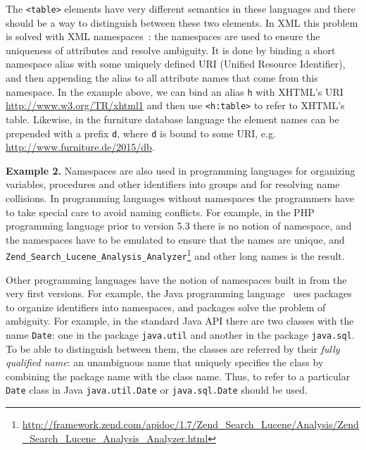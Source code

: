 The \verb|<table>| elements have very different semantics in these languages
and there should be a way to distinguish between these two elements.
In XML this problem is solved with XML namespaces~\cite{xmlnamespaces}:
the namespaces are used to ensure the uniqueness of attributes and resolve ambiguity.
It is done by binding a short namespace alias with some uniquely defined URI
(Unified Resource Identifier), and then appending the alias to
all attribute names that come from this namespace. In the example above,
we can bind an alias \verb|h| with XHTML's URI \url{http://www.w3.org/TR/xhtml1}
and then use \verb|<h:table>| to refer to XHTML's table. Likewise,
in the furniture database language the element names can be prepended
with a prefix \verb|d|, where \verb|d| is bound to some URI, e.g.
\url{http://www.furniture.de/2015/db}.




\textbf{Example 2.} Namespaces are also used in programming languages for organizing
variables, procedures and other identifiers into groups and
for resolving name collisions. In programming languages without
namespaces the programmers have to take special care to avoid
naming conflicts. For example, in the PHP programming language
prior to version 5.3 \cite{mcarthur2008php6} there is no notion of namespace, and
the namespaces have to be emulated to ensure that the names
are unique, and 
\verb|Zend_Search_Lucene_Analysis_Analyzer|\footnote{\url{http://framework.zend.com/apidoc/1.7/Zend_Search_Lucene/Analysis/Zend_Search_Lucene_Analysis_Analyzer.html}}
and other long names is the result.

Other programming languages have the notion of namespaces built in
from the very first versions. For example, the Java programming
language~\cite{gosling2014java} uses packages to organize identifiers into
namespaces, and packages solve the problem of ambiguity. For example,
in the standard Java API there are two classes with the name \texttt{Date}:
one in the package \texttt{java.util} and another in the package \texttt{java.sql}.
To be able to distinguish between them, the classes are referred by their
\emph{fully qualified name}: an unambiguous name that uniquely specifies the class
by combining the package name with the class name. Thus, to refer to a particular
\texttt{Date} class in Java  \texttt{java.util.Date} or  \texttt{java.sql.Date}
should be used.

